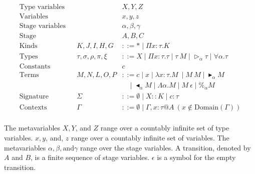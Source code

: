 \documentclass[runningheads]{llncs}
\newcommand{\G}{\Gamma}
\newcommand{\TW}{\triangleright}
\newcommand{\F}{\forall}
\newcommand{\TB}{\blacktriangleright}
\newcommand{\TBL}{\blacktriangleleft}
\begin{document}
\begin{align*}
	\textrm{Type variables}  &  &                          & X,Y,Z                                                                             \\
	\textrm{Variables}       &  &                          & x,y,z                                                                             \\
	\textrm{Stage variables} &  &                          & \alpha,\beta,\gamma                                                               \\
	\textrm{Stage}           &  &                          & A,B,C                                                                             \\
	\textrm{Kinds}           &  & K,J,I,H,G                & ::= * \mid \Pi x:\tau.K                                                           \\
	\textrm{Types}           &  & \tau,\sigma,\rho,\pi,\xi & ::= X \mid \Pi x:\tau.\tau \mid \tau\ M \mid \TW_{\alpha} \tau \mid \F\alpha.\tau \\
	\textrm{Constants}       &  &                          & c                                                                                 \\
	\textrm{Terms}           &  & M,N,L,O,P                & ::= c \mid x \mid \lambda x:\tau.M\ \mid M\ M \mid \TB_\alpha M                   \\
	                         &  &                          & \ \ \ \ \mid \TBL_\alpha M \mid \Lambda\alpha.M \mid M\ \epsilon \mid \%_\alpha M         \\  
	\textrm{Signature}       &  & \Sigma                   & ::= \emptyset \mid X::K \mid c:\tau                                               \\
	\textrm{Contexts}        &  & \Gamma                   & ::= \emptyset \mid  \Gamma,x:\tau @A\ (x\not\in\textrm{Domain}(\G))               \\
\end{align*}


The metavariables $X, Y$, and $Z$ range over a countably infinite set of type variables.
$x, y$, and, $z$ range over a countably infinite set of variables.
The metavariables $\alpha, \beta, \text{and} \gamma$ range over the stage variables.
A transition, denoted by $A$ and $B$, is a finite sequence of stage variables.
$\epsilon$ is a symbol for the empty transition.
\end{document}
